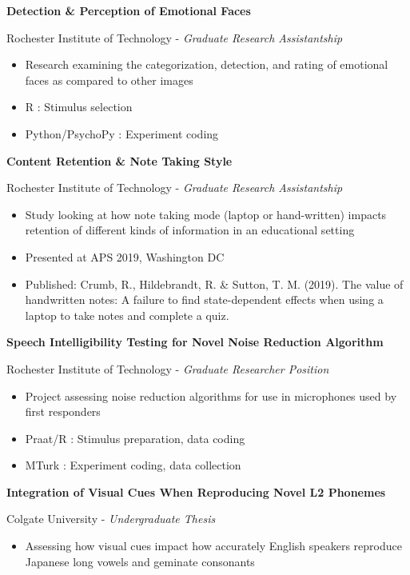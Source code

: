 \documentclass[a4paper,9pt]{extarticle}
\begin{document}
\noindent\textbf{Detection \& Perception of Emotional Faces}

Rochester Institute of Technology - \textit{Graduate Research Assistantship}
\begin{itemize}
\item Research examining the categorization, detection, and rating of emotional faces as compared to other images
\item R : Stimulus selection
\item Python/PsychoPy : Experiment coding
\end{itemize}

\noindent\textbf{Content Retention \& Note Taking Style}

Rochester Institute of Technology - \textit{Graduate Research Assistantship}
\begin{itemize}
\item Study looking at how note taking mode (laptop or hand-written) impacts retention of different kinds of information in an educational setting
\item Presented at APS 2019, Washington DC
\item Published: Crumb, R., Hildebrandt, R. \& Sutton, T. M. (2019). The value of handwritten notes: A failure to find state-dependent effects when using a laptop to take notes and complete a quiz.
\end{itemize}

\noindent\textbf{Speech Intelligibility Testing for Novel Noise Reduction Algorithm}

Rochester Institute of Technology - \textit{Graduate Researcher Position}
\begin{itemize}
\item Project assessing noise reduction algorithms for use in microphones used by first responders
\item Praat/R : Stimulus preparation, data coding
\item MTurk : Experiment coding, data collection
\end{itemize}

\noindent\textbf{Integration of Visual Cues When Reproducing Novel L2 Phonemes}

Colgate University - \textit{Undergraduate Thesis}
\begin{itemize}
\item Assessing how visual cues impact how accurately English speakers reproduce Japanese long vowels and geminate consonants
\end{itemize}
\end{document}
